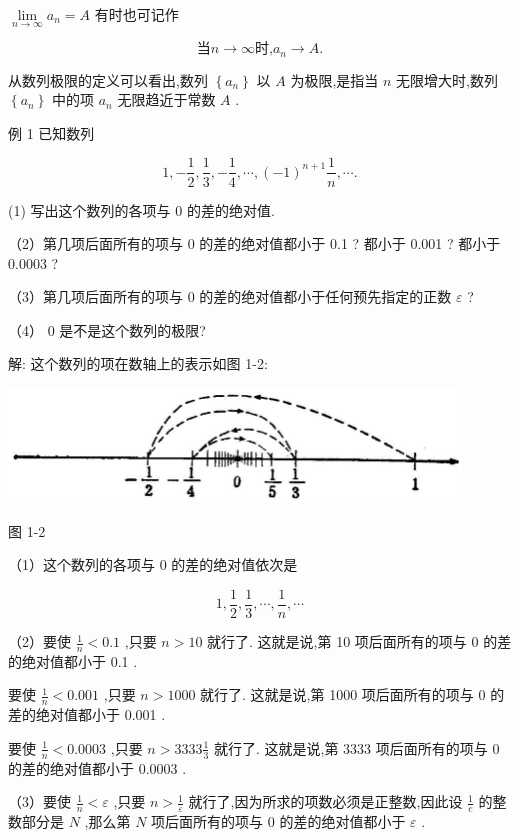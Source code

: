 \documentclass[lang=cn,newtx,10pt,scheme=chinese]{elegantbook}
\begin{document}
\(\mathop{\lim }\limits_{{n \rightarrow \infty }}{a}_{n} = A\) 有时也可记作

\[
\text{当}n \rightarrow \infty \text{时,}{a}_{n} \rightarrow A\text{.}
\]

从数列极限的定义可以看出,数列 \(\left\{ {a}_{n}\right\}\) 以 \(A\) 为极限,是指当 \(n\) 无限增大时,数列 \(\left\{ {a}_{n}\right\}\) 中的项 \({a}_{n}\) 无限趋近于常数 \(A\) .

例 1 已知数列

\[
1, - \frac{1}{2},\frac{1}{3}, - \frac{1}{4},\cdots ,{\left( -1\right) }^{n + 1}\frac{1}{n},\cdots \text{.}
\]

(1) 写出这个数列的各项与 0 的差的绝对值.

（2）第几项后面所有的项与 0 的差的绝对值都小于 0.1 ? 都小于 0.001 ? 都小于 0.0003 ?

（3）第几项后面所有的项与 0 的差的绝对值都小于任何预先指定的正数 \(\varepsilon\) ?

（4） 0 是不是这个数列的极限?

解: 这个数列的项在数轴上的表示如图 1-2:

\begin{center}
	\includegraphics[max width=0.9\textwidth]{images/01912c18-5c3f-733d-b775-749ba9897a9d_7_608223.jpg}
\end{center}

图 1-2

（1）这个数列的各项与 0 的差的绝对值依次是

\[
1,\frac{1}{2},\frac{1}{3},\cdots ,\frac{1}{n},\cdots
\]

（2）要使 \(\frac{1}{n} < {0.1}\) ,只要 \(n > {10}\) 就行了. 这就是说,第 10 项后面所有的项与 0 的差的绝对值都小于 0.1 .

要使 \(\frac{1}{n} < {0.001}\) ,只要 \(n > {1000}\) 就行了. 这就是说,第 1000 项后面所有的项与 0 的差的绝对值都小于 0.001 .

要使 \(\frac{1}{n} < {0.0003}\) ,只要 \(n > {3333}\frac{1}{3}\) 就行了. 这就是说,第 3333 项后面所有的项与 0 的差的绝对值都小于 0.0003 .

（3）要使 \(\frac{1}{n} < \varepsilon\) ,只要 \(n > \frac{1}{\varepsilon }\) 就行了,因为所求的项数必须是正整数,因此设 \(\frac{1}{e}\) 的整数部分是 \(N\) ,那么第 \(N\) 项后面所有的项与 0 的差的绝对值都小于 \(\varepsilon\) .
\end{document}
